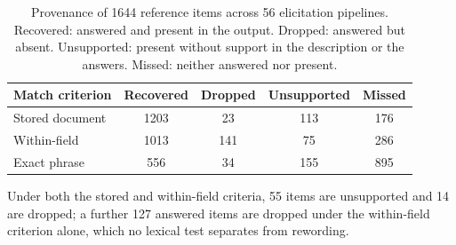 \begin{table}[t]
\caption{Provenance of 1644 reference items across 56 elicitation pipelines. Recovered: answered and present in the output. Dropped: answered but absent. Unsupported: present without support in the description or the answers. Missed: neither answered nor present.}
\label{tab:provenance}
\centering
\small
\begin{tabular}{lcccc}
\toprule
Match criterion & Recovered & Dropped & Unsupported & Missed \\
\midrule
Stored document & 1203 & 23 & 113 & 176 \\
Within-field & 1013 & 141 & 75 & 286 \\
Exact phrase & 556 & 34 & 155 & 895 \\
\bottomrule
\end{tabular}
\par\vspace{2pt}\footnotesize Under both the stored and within-field criteria, 55 items are unsupported and 14 are dropped; a further 127 answered items are dropped under the within-field criterion alone, which no lexical test separates from rewording.
\end{table}
